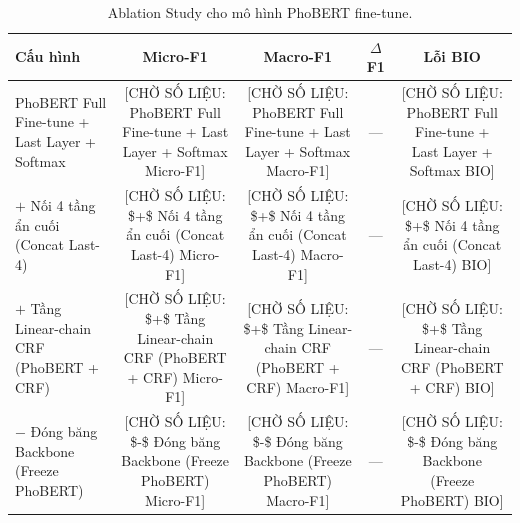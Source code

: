 \begin{table}[t]
\centering
\small
\begin{tabular}{lcccc}
\hline
\textbf{Cấu hình} & \textbf{Micro-F1} & \textbf{Macro-F1} & \textbf{$\Delta$F1} & \textbf{Lỗi BIO} \\
\hline
PhoBERT Full Fine-tune + Last Layer + Softmax & [CHỜ SỐ LIỆU: PhoBERT Full Fine-tune + Last Layer + Softmax Micro-F1] & [CHỜ SỐ LIỆU: PhoBERT Full Fine-tune + Last Layer + Softmax Macro-F1] & — & [CHỜ SỐ LIỆU: PhoBERT Full Fine-tune + Last Layer + Softmax BIO] \\
  $+$ Nối 4 tầng ẩn cuối (Concat Last-4) & [CHỜ SỐ LIỆU:   \$+\$ Nối 4 tầng ẩn cuối (Concat Last-4) Micro-F1] & [CHỜ SỐ LIỆU:   \$+\$ Nối 4 tầng ẩn cuối (Concat Last-4) Macro-F1] & — & [CHỜ SỐ LIỆU:   \$+\$ Nối 4 tầng ẩn cuối (Concat Last-4) BIO] \\
  $+$ Tầng Linear-chain CRF (PhoBERT + CRF) & [CHỜ SỐ LIỆU:   \$+\$ Tầng Linear-chain CRF (PhoBERT + CRF) Micro-F1] & [CHỜ SỐ LIỆU:   \$+\$ Tầng Linear-chain CRF (PhoBERT + CRF) Macro-F1] & — & [CHỜ SỐ LIỆU:   \$+\$ Tầng Linear-chain CRF (PhoBERT + CRF) BIO] \\
  $-$ Đóng băng Backbone (Freeze PhoBERT) & [CHỜ SỐ LIỆU:   \$-\$ Đóng băng Backbone (Freeze PhoBERT) Micro-F1] & [CHỜ SỐ LIỆU:   \$-\$ Đóng băng Backbone (Freeze PhoBERT) Macro-F1] & — & [CHỜ SỐ LIỆU:   \$-\$ Đóng băng Backbone (Freeze PhoBERT) BIO] \\
\hline
\end{tabular}
\caption{Ablation Study cho mô hình PhoBERT fine-tune.}
\label{tab:ablation_phobert}
\end{table}
